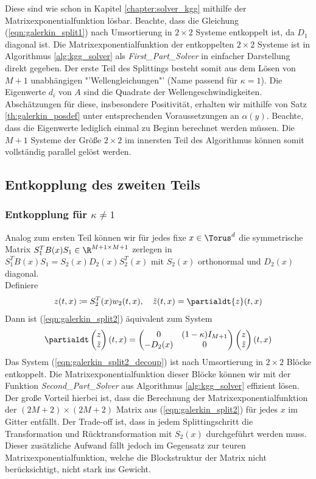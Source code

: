 Diese sind wie schon in Kapitel \ref{chapter:solver_kgg} mithilfe der Matrixexponentialfunktion lösbar. Beachte, dass die Gleichung (\ref{eqn:galerkin_split1}) nach Umsortierung in $2\times 2$ Systeme entkoppelt ist, da $D_1$ diagonal ist. Die Matrixexponentialfunktion der entkoppelten $2\times 2$ Systeme ist in Algorithmus \ref{alg:kgg_solver} als \emph{First\_Part\_Solver} in einfacher Darstellung direkt gegeben. Der erste Teil des Splittings besteht somit aus dem Lösen von $M+1$ unabhängigen "'Wellengleichungen"' (Name passend für $\kappa=1$). Die Eigenwerte $d_i$ von $A$ sind die Quadrate der Wellengeschwindigkeiten. Abschätzungen für diese, insbesondere Positivität, erhalten wir mithilfe von Satz \ref{th:galerkin_posdef} unter entsprechenden Voraussetzungen an $\alpha(y)$. Beachte, dass die Eigenwerte lediglich einmal zu Beginn berechnet werden müssen. Die $M+1$ Systeme der Größe $2\times 2$ im innersten Teil des Algorithmus können somit vollständig parallel gelöst werden.

\subsection{Entkopplung des zweiten Teils}
\subsubsection*{Entkopplung für $\kappa \neq 1$}
Analog zum ersten Teil können wir für jedes fixe $x\in\Torus^d$ die symmetrische Matrix $S_1^TB(x)S_1\in\R^{M+1\times M+1}$ zerlegen in $S_1^TB(x)S_1=S_2(x)D_2(x)S_2^T(x)$ mit $S_2(x)$ orthonormal und $D_2(x)$ diagonal.\\
Definiere
\[z(t,x)\coloneqq S_2^T(x) w_2(t,x), \quad \tilde{z}(t,x)=\partialdt{z}(t,x)\]
Dann ist (\ref{eqn:galerkin_split2}) äquivalent zum System
\begin{equation}
\label{eqn:galerkin_split2_decoup}
\partialdt\begin{pmatrix}z\\ \tilde{z}\end{pmatrix}(t,x)=\begin{pmatrix}0&(1-\kappa)I_{M+1}\\-D_2(x) & 0\end{pmatrix}\begin{pmatrix}z\\\tilde{z}\end{pmatrix}(t,x)
\end{equation}
Das System (\ref{eqn:galerkin_split2_decoup}) ist nach Umsortierung in $2\times 2$ Blöcke entkoppelt. Die Matrixexponentialfunktion dieser Blöcke können wir mit der Funktion \emph{Second\_Part\_Solver} aus Algorithmus \ref{alg:kgg_solver} effizient lösen. Der große Vorteil hierbei ist, dass die Berechnung der Matrixexponentialfunktion der $(2M+2)\times (2M+2)$ Matrix aus (\ref{eqn:galerkin_split2}) für jedes $x$ im Gitter entfällt. Der Trade-off ist, dass in jedem Splittingschritt die Transformation und Rücktransformation mit $S_2(x)$ durchgeführt werden muss. Dieser zusätzliche Aufwand fällt jedoch im Gegensatz zur teuren Matrixexponentialfunktion, welche die Blockstruktur der Matrix nicht berücksichtigt, nicht stark ins Gewicht.
